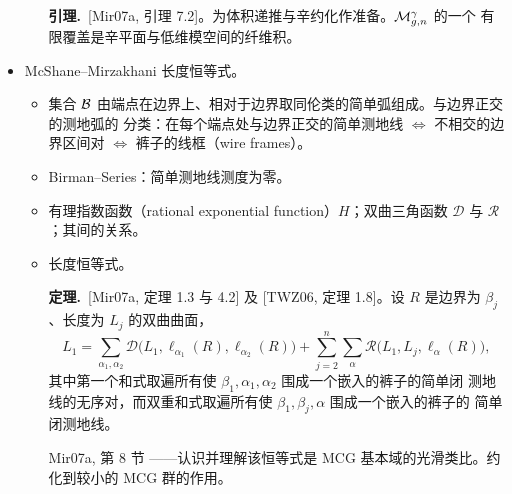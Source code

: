 \begin{itemize}[leftmargin=1.6em,itemsep=2pt,topsep=2pt]
\begin{itemize}[leftmargin=1.6em,itemsep=2pt,topsep=2pt]
    \textbf{引理.}\ [Mir07a, 引理 7.2]。为体积递推与辛约化作准备。$\Mgn^\gamma$ 的一个
    有限覆盖是辛平面与低维模空间的纤维积。
  \end{itemize}

\item McShane--Mirzakhani 长度恒等式。
  \begin{itemize}[leftmargin=1.6em,itemsep=2pt,topsep=2pt]
  \item 集合 $\mathcal{B}$ 由端点在边界上、相对于边界取同伦类的简单弧组成。与边界正交的测地弧的
    分类：在每个端点处与边界正交的简单测地线 $\Longleftrightarrow$ 不相交的边界区间对
    $\Longleftrightarrow$ 裤子的线框（wire frames）。
  \item Birman--Series：简单测地线测度为零。
  \item 有理指数函数（rational exponential function）$H$；双曲三角函数
    $\mathcal{D}$ 与 $\mathcal{R}$；其间的关系。
  \item 长度恒等式。

    \textbf{定理.}\ [Mir07a, 定理 1.3 与 4.2] 及 [TWZ06, 定理 1.8]。设 $R$ 是边界为
    $\beta_j$、长度为 $L_j$ 的双曲曲面，
    \[
    L_1=\sum_{\alpha_1,\alpha_2}\mathcal{D}\big(L_1,\ell_{\alpha_1}(R),\ell_{\alpha_2}(R)\big)
    +\sum_{j=2}^{n}\sum_{\alpha}\mathcal{R}\big(L_1,L_j,\ell_\alpha(R)\big),
    \]
    其中第一个和式取遍所有使 $\beta_1,\alpha_1,\alpha_2$ 围成一个嵌入的裤子的简单闭
    测地线的无序对，而双重和式取遍所有使 $\beta_1,\beta_j,\alpha$ 围成一个嵌入的裤子的
    简单闭测地线。
  \item [Mir07a, 第 8 节]——认识并理解该恒等式是 MCG 基本域的光滑类比。约化到较小的
    MCG 群的作用。
  \end{itemize}



\end{itemize}
